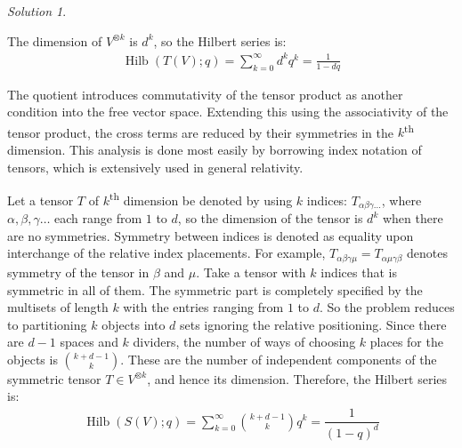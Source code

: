 \documentclass{article}
\theoremstyle{definition}
\theoremstyle{remark}
\newtheorem*{Solution*}{Solution}
\theoremstyle{underline}
\theoremstyle{underline}
\DeclareMathOperator{\Hilb}{Hilb}
\renewcommand{\th}{\textsuperscript{th}\xspace}
\begin{document}
	\begin{Solution*}
		\begin{subquests}
			\item The dimension of $V^{\otimes k}$ is $d^k$, so the Hilbert series is:
			\begin{gather*}
				\Hilb(T(V);q) = \sum_{k=0}^{\infty}d^k q^k = \frac{1}{1-dq}
			\end{gather*}
			
			\item The quotient introduces commutativity of the tensor product as another condition into the free vector space. Extending this using the associativity of the tensor product, the cross terms are reduced by their symmetries in the $k$\th dimension. This analysis is done most easily by borrowing index notation of tensors, which is extensively used in general relativity.

			Let a tensor $T$ of $k$\th dimension be denoted by using $k$ indices: $T_{\alpha\beta\gamma\dots}$, where $\alpha,\beta,\gamma \dots$ each range from $1$ to $d$, so the dimension of the tensor is $d^k$ when there are no symmetries. Symmetry between indices is denoted as equality upon interchange of the relative index placements. For example, $T_{\alpha\beta\gamma\mu} = T_{\alpha\mu\gamma\beta}$ denotes symmetry of the tensor in $\beta$ and $\mu$. Take a tensor with $k$ indices that is symmetric in all of them. The symmetric part is completely specified by the multisets of length $k$ with the entries ranging from $1$ to $d$. So the problem reduces to partitioning $k$ objects into $d$ sets ignoring the relative positioning. Since there are $d-1$ spaces and $k$ dividers, the number of ways of choosing $k$ places for the objects is $\binom{k+d-1}{k}$. These are the number of independent components of the symmetric tensor $T \in V^{\otimes k}$, and hence its dimension. Therefore, the Hilbert series is:
			\begin{gather*}
				\Hilb(S(V);q) = \sum_{k=0}^{\infty} \binom{k+d-1}{k} q^k = \dfrac 1 {(1 - q)^d}
			\end{gather*}


\end{subquests}
\end{Solution*}
\end{document}
